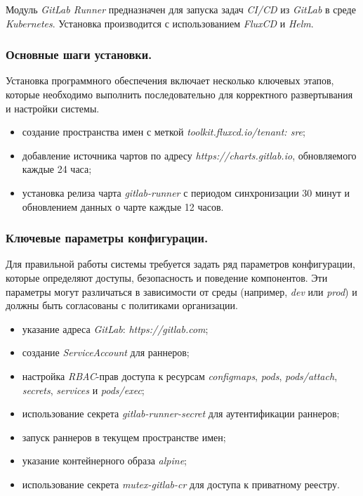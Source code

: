 Модуль \textit{GitLab Runner} предназначен для запуска задач \textit{CI/CD} из \textit{GitLab} в среде \textit{Kubernetes}. Установка производится с использованием \textit{FluxCD} и \textit{Helm}.

\subsubsection{Основные шаги установки.} Установка программного обеспечения включает несколько ключевых этапов, которые необходимо выполнить последовательно для корректного развертывания и настройки системы.

\begin{itemize}
    \item создание пространства имен с меткой \textit{toolkit.fluxcd.io/tenant: sre};
    \item добавление источника чартов по адресу \textit{https://charts.gitlab.io}, обновляемого каждые 24 часа;
    \item установка релиза чарта \textit{gitlab-runner} с периодом синхронизации 30 минут и обновлением данных о чарте каждые 12 часов.
\end{itemize}

\subsubsection{Ключевые параметры конфигурации.} Для правильной работы системы требуется задать ряд параметров конфигурации, которые определяют доступы, безопасность и поведение компонентов. Эти параметры могут различаться в зависимости от среды (например, \textit{dev} или \textit{prod}) и должны быть согласованы с политиками организации.

\begin{itemize}
    \item указание адреса \textit{GitLab}: \textit{https://gitlab.com};
    \item создание \textit{ServiceAccount} для раннеров;
    \item настройка \textit{RBAC}-прав доступа к ресурсам \textit{configmaps}, \textit{pods}, \textit{pods/attach}, \textit{secrets}, \textit{services} и \textit{pods/exec};
    \item использование секрета \textit{gitlab-runner-secret} для аутентификации раннеров;
    \item запуск раннеров в текущем пространстве имен;
    \item указание контейнерного образа \textit{alpine};
    \item использование секрета \textit{mutex-gitlab-cr} для доступа к приватному реестру.
\end{itemize}




